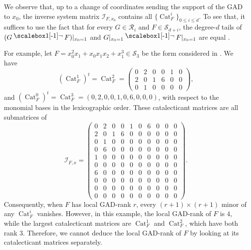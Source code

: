 \documentclass{amsart}
\theoremstyle{plain}
\renewcommand{\k}{\Bbbk}
\renewcommand{\S}{\mathcal{S}}
\newcommand{\contract}{\mathbin{\mathpalette\dointprod\relax}}
\newcommand{\dointprod}[2]{%
  \raisebox{\depth}{\scalebox{1}[-1]{$#1\lnot$}}}
\def\\k{{\mathsf{k}}}
\def\R{\mathcal{R}}
\numberwithin{equation}{section}
\begin{document}
We observe that, up to a change of coordinates sending the support of the GAD to $x_0$, the inverse system matrix $\mathcal{I}_{F,x_0}$ contains all $\{\operatorname{Cat}_F^{i}\}_{0 \leq i \leq d}$.
To see that, it suffices to use the fact that for every $G \in \R_i$ and $F\in \S_{d+i}$, the degree-$d$ tails of $(G\contract F)|_{x_0 = 1}$ and $G|_{x_0 = 1} \contract F|_{x_0 = 1}$ are equal \cite[Lemma 2]{BJMR18}.

For example, let $F=x_0^2x_1+x_0x_1x_2+x_1^3\in \S_3$ be the form considered in . We have 
\[(\operatorname{Cat}_F^1)^t=\operatorname{Cat}_F^2=\begin{pmatrix}
0 & 2 & 0 & 0 & 1 & 0 \\
2 & 0 & 1 & 6 & 0 & 0 \\
0 & 1 & 0 & 0 & 0 & 0 
\end{pmatrix},\]
and $(\operatorname{Cat}_F^0)^t=\operatorname{Cat}_F^3=(0,2,0,0,1,0,6,0,0,0)$, with respect to the monomial bases in the lexicographic order. 
These catalecticant matrices are all submatrices of
\[\mathcal{I}_{F, x}=
\begin{pmatrix}
0 & 2 & 0 & 0 & 1 & 0 & 6 & 0 & 0 & 0 \\
2 & 0 & 1 & 6 & 0 & 0 & 0 & 0 & 0 & 0 \\
0 & 1 & 0 & 0 & 0 & 0 & 0 & 0 & 0 & 0 \\
0 & 6 & 0 & 0 & 0 & 0 & 0 & 0 & 0 & 0 \\
1 & 0 & 0 & 0 & 0 & 0 & 0 & 0 & 0 & 0 \\
0 & 0 & 0 & 0 & 0 & 0 & 0 & 0 & 0 & 0 \\
6 & 0 & 0 & 0 & 0 & 0 & 0 & 0 & 0 & 0 \\
0 & 0 & 0 & 0 & 0 & 0 & 0 & 0 & 0 & 0 \\
0 & 0 & 0 & 0 & 0 & 0 & 0 & 0 & 0 & 0 \\
0 & 0 & 0 & 0 & 0 & 0 & 0 & 0 & 0 & 0
\end{pmatrix}.
\]
Consequently, when $F$ has local GAD-rank $r$, every $(r+1) \times (r+1)$ minor of any $\operatorname{Cat}_F^i$ vanishes.
However, in this example, the local GAD-rank of $F$ is $4$, while the largest catalecticant matrices are $\operatorname{Cat}_F^1$ and $\operatorname{Cat}_F^2$, which have both rank $3$.
Therefore, we cannot deduce the local GAD-rank of $F$ by looking at its catalecticant matrices separately.
\end{document}
